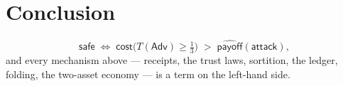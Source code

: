 \documentclass[11pt,letterpaper]{article}
\begin{document}
\section{Conclusion}

\[
\mathsf{safe}
\;\iff\;
\mathsf{cost}\bigl(T(\mathsf{Adv})\geq\tfrac13\bigr)
\;>\;
\widehat{\mathsf{payoff}}(\mathsf{attack}),
\]
and every mechanism above --- receipts, the trust laws, sortition, the
ledger, folding, the two-asset economy --- is a term on the left-hand
side.

\begingroup
\raggedright


\endgroup
\end{document}
